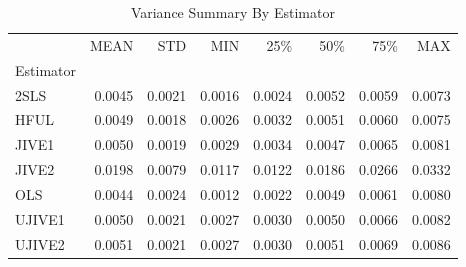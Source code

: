 \begin{table}[ht]
\centering
\caption{Variance Summary By Estimator}
\begin{tabular}{lrrrrrrr}
\toprule
 & MEAN & STD & MIN & 25\% & 50\% & 75\% & MAX \\
Estimator &  &  &  &  &  &  &  \\
\midrule
2SLS & 0.0045 & 0.0021 & 0.0016 & 0.0024 & 0.0052 & 0.0059 & 0.0073 \\
HFUL & 0.0049 & 0.0018 & 0.0026 & 0.0032 & 0.0051 & 0.0060 & 0.0075 \\
JIVE1 & 0.0050 & 0.0019 & 0.0029 & 0.0034 & 0.0047 & 0.0065 & 0.0081 \\
JIVE2 & 0.0198 & 0.0079 & 0.0117 & 0.0122 & 0.0186 & 0.0266 & 0.0332 \\
OLS & 0.0044 & 0.0024 & 0.0012 & 0.0022 & 0.0049 & 0.0061 & 0.0080 \\
UJIVE1 & 0.0050 & 0.0021 & 0.0027 & 0.0030 & 0.0050 & 0.0066 & 0.0082 \\
UJIVE2 & 0.0051 & 0.0021 & 0.0027 & 0.0030 & 0.0051 & 0.0069 & 0.0086 \\
\bottomrule
\end{tabular}
\end{table}
